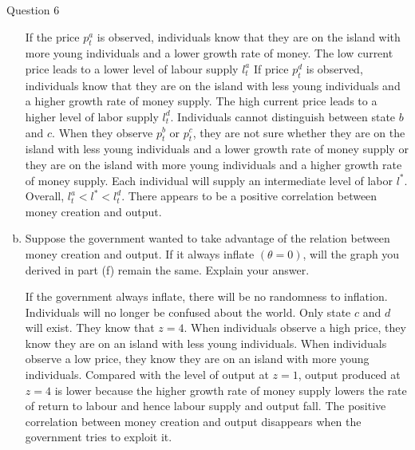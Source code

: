 \documentclass[a4paper]{article}
\newif\IfInSansMode
\numberwithin{equation}{section}
\numberwithin{figure}{section}
\begin{document}
\begin{questionbox}{Question 6}
\begin{enumerate}[(a), resume]
\begin{explanationbox}
				If the price \(p_t^a\) is observed, individuals know that they are on the island with more young individuals and a lower growth rate of money. The low current price leads to a lower level of labour supply \( l_t^a \) If price \( p^d_t \) is observed, individuals know that they are on the island with less young individuals and a higher growth rate of money supply. The high current price leads to a higher level of labor supply \( l_t^d \). Individuals cannot distinguish between state \( b \) and \( c \). When they observe \(p_t^b\) or \(p_t^c\), they are not sure whether they are on the island with less young individuals and a lower growth rate of money supply or they are on the island with more young individuals and a higher growth rate of money supply. Each individual will supply an intermediate level of labor \( l^* \). Overall, \(l_t^a < l^* < l_t^d\). There appears to be a positive correlation between money creation and output.
			\end{explanationbox}
			\begin{explanationbox}
				\begin{figure}[H]
					\centering
				\end{figure}	
			\end{explanationbox}
			\item Suppose the government wanted to take advantage of the relation between money creation and output. If it always inflate \( (\theta = 0) \), will the graph you derived in part (f) remain the same. Explain your answer.
			\begin{explanationbox}
				If the government always inflate, there will be no randomness to inflation. Individuals will no longer be confused about the world. Only state \(c\) and \(d\) will exist. They know that \(z = 4\). When individuals observe a high price, they know they are on an island with less young individuals. When individuals observe a low price, they know they are on an island with more young individuals. Compared with the level of output at \(z = 1\), output produced at \(z = 4\) is lower because the higher growth rate of money supply lowers the rate of return to labour and hence labour supply and output fall. The positive correlation between money creation and output disappears when the government tries to exploit it.
			\end{explanationbox}
		\end{enumerate}
	\end{questionbox}
\end{document}
